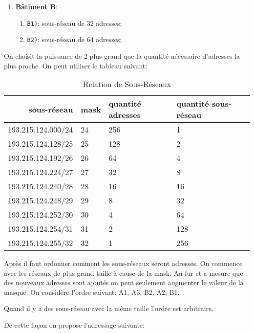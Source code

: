 \documentclass{article}
\begin{document}
\begin{resolution}
\begin{enumerate}
        \item \textbf{Bâtiment B}:
        \begin{enumerate}[noitemsep]
            \item \texttt{B1)}: sous-réseau de 32 adresses;
            \item \texttt{B2)}: sous-réseau de 64 adresses;
        \end{enumerate}
    \end{enumerate}
    \begin{remark}
        On choisit la puissance de 2 plus grand que la quantité nécessaire d'adresses la plus proche. On peut utiliser le tableau suivant:
        \begin{table}[H]
            \centering\begin{tabular}{rlll}
                sous-réseau & mask & quantité adresses & quantité sous-réseau\\
                \hline
                193.215.124.000/24 & 24 & 256 & 1\\
                193.215.124.128/25 & 25 & 128 & 2\\
                193.215.124.192/26 & 26 & 64  & 4\\
                193.215.124.224/27 & 27 & 32  & 8\\
                193.215.124.240/28 & 28 & 16  & 16\\
                193.215.124.248/29 & 29 & 8   & 32\\
                193.215.124.252/30 & 30 & 4   & 64\\
                193.215.124.254/31 & 31 & 2   & 128\\
                193.215.124.255/32 & 32 & 1   & 256\\
                \hline 
            \end{tabular}
            \caption{Relation de Sous-Réseaux}
        \end{table}
    \end{remark}
    Après il faut ordonner comment les sous-réseaux seront adresses. On commence avec les réseaux de plus grand taille à cause de la mask. Au fur et a mesure que des nouveaux adresses sont ajoutés on peut seulement augmenter le valeur de la masque. On considère l'ordre suivant: A1, A3, B2, A2, B1.
    \begin{remark}
        Quand il y a des sous-réseau avec la même taille l'ordre est arbitraire.
    \end{remark}  
    De cette façon on propose l'adressage suivante:

\end{resolution}
\end{document}
